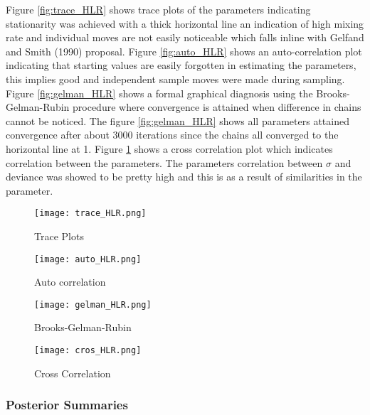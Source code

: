 \documentclass[11pt]{article}
\begin{document}
Figure \ref{fig:trace_HLR} shows trace plots of the parameters indicating stationarity was achieved with a thick horizontal line an indication of high mixing rate and individual moves are not easily noticeable which falls inline with Gelfand and Smith (1990) proposal. Figure \ref{fig:auto_HLR} shows an auto-correlation plot indicating that starting values are easily forgotten in estimating the parameters, this implies good and independent sample moves were made during sampling. Figure \ref{fig:gelman_HLR} shows a formal graphical diagnosis using the Brooks-Gelman-Rubin procedure where convergence is attained when difference in chains cannot be noticed. The figure \ref{fig:gelman_HLR} shows all parameters attained convergence after about 3000 iterations since the chains all converged to the horizontal line at 1. Figure \ref{fig:cros_HLR} shows a cross correlation plot which indicates correlation between the parameters. The parameters correlation between $\sigma$ and deviance was showed to be pretty high and this is as a result of similarities in the parameter.

 
    \begin{figure}[H]
  \begin{minipage}[b]{0.4\textwidth}
    \texttt{[image: trace\_HLR.png]}
    \caption{Trace Plots}
    \label{fig:trace_HLR}
  \end{minipage}
  \hfill
  \begin{minipage}[b]{0.45\textwidth}
    \texttt{[image: auto\_HLR.png]}
    \caption{Auto correlation}
    \label{fig:auto_HLR}
  \end{minipage}
    \hfill
  \begin{minipage}[b]{0.45\textwidth}
    \texttt{[image: gelman\_HLR.png]}
    \caption{Brooks-Gelman-Rubin}
    \label{fig:gelman_HLR}
  \end{minipage}
      \hfill
  \begin{minipage}[b]{0.45\textwidth}
    \texttt{[image: cros\_HLR.png]}
    \caption{Cross Correlation}
    \label{fig:cros_HLR}
  \end{minipage}
\end{figure}



\subsubsection{Posterior Summaries}
\end{document}
